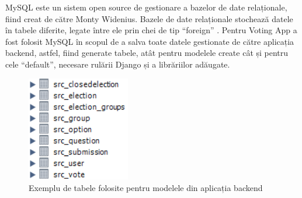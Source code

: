 MySQL este un sistem open source de gestionare a bazelor de date relaționale, fiind creat de către Monty Widenius. Bazele de date relaționale stochează datele în tabele diferite, legate între ele prin chei de tip \enquote{foreign} \cite{what_is_mysql}. Pentru Voting App a fost folosit MySQL în scopul de a salva toate datele gestionate de către aplicația backend, astfel, fiind generate tabele, atât pentru modelele create cât și pentru cele \enquote{default}, necesare rulării Django și a librăriilor adăugate.

\begin{figure}[!h]
    \centering
    \includegraphics[width=45mm]{images/my_sql_example.png}
    \caption{Exemplu de tabele folosite pentru modelele din aplicația backend}
\end{figure}